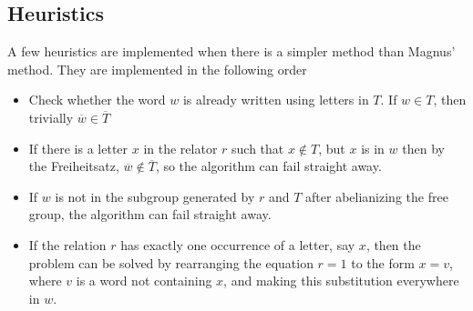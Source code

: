 \documentclass[11pt]{article} %
\theoremstyle{definition}
\theoremstyle{definition}
\theoremstyle{definition}
\theoremstyle{definition}
\theoremstyle{definition}
\theoremstyle{definition}
\begin{document}





\subsection{Heuristics}

A few heuristics are implemented when there is a simpler method than Magnus' method.
They are implemented in the following order

\begin{itemize}
  \item Check whether the word $w$ is already written using letters in $T$. If $w \in T$,
  then trivially $\overline{w} \in \overline{T}$

  \item If there is a letter $x$ in the relator $r$ such that $x \notin T$, but
  $x$ is in $w$ then by the Freiheitsatz, $\overline{w} \notin \overline{T}$,
  so the algorithm can fail straight away.

  \item If $w$ is not in the subgroup generated by $r$ and $T$ after abelianizing the free
    group, the algorithm can fail straight away.

  \item If the relation $r$ has exactly one occurrence of a letter, say $x$, then
    the problem can be solved by rearranging the equation $r = 1$ to the form
    $x = v$, where $v$ is a word not containing $x$, and making this substitution everywhere
    in $w$.
\end{itemize}
\end{document}

